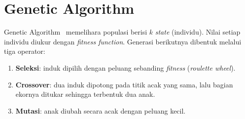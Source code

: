 \section{Genetic Algorithm}

Genetic Algorithm~\cite{russell2010aima,khodra2021ga,kkif2026slides} memelihara
populasi berisi $k$ \textit{state} (individu). Nilai setiap individu diukur dengan
\textit{fitness function}. Generasi berikutnya dibentuk melalui tiga operator:
\begin{enumerate}
	\item \textbf{Seleksi}: induk dipilih dengan peluang sebanding \textit{fitness}
	(\textit{roulette wheel}).
	\item \textbf{Crossover}: dua induk dipotong pada titik acak yang sama, lalu
	bagian ekornya ditukar sehingga terbentuk dua anak.
	\item \textbf{Mutasi}: anak diubah secara acak dengan peluang kecil.
\end{enumerate}
